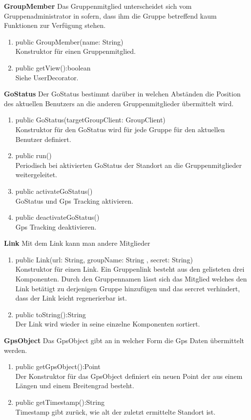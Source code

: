 \textbf{GroupMember}
Das Gruppenmitglied unterscheidet sich vom Gruppenadministrator in sofern, dass ihm die Gruppe betreffend kaum Funktionen zur Verfügung stehen.  
\begin{enumerate}
	\item public GroupMember(name: String)\\
		Konstruktor für einen Gruppenmitglied.
	\item public getView():boolean\\
		Siehe UserDecorator.
\end{enumerate}

\textbf{GoStatus}
Der GoStatus bestimmt darüber in welchen Abständen die Position des aktuellen Benutzers an die anderen Gruppenmitglieder übermittelt wird.
\begin{enumerate}
	\item public GoStatus(targetGroupClient: GroupClient)\\
		Konstruktor für den GoStatus wird für jede Gruppe für den aktuellen Benutzer definiert.
	\item public run()\\
		Periodisch bei aktivierten GoStatus der Standort an die Gruppenmitglieder weitergeleitet.
	\item public activateGoStatus()\\
		GoStatus und Gps Tracking aktivieren.
	\item public deactivateGoStatus()\\
		Gps Tracking deaktivieren.
\end{enumerate}

\textbf{Link}
Mit dem Link kann man andere Mitglieder 
\begin{enumerate}
	\item public Link(url: String, groupName: String , secret: String)\\
		Konstruktor für einen Link. Ein Gruppenlink besteht aus den gelisteten drei Komponenten. Durch den Gruppennamen lässt sich das Mitglied welches den Link betätigt zu derjenigen Gruppe hinzufügen und das sercret verhindert, dass der Link leicht regenerierbar ist.
	\item public toString():String\\
		Der Link wird wieder in seine einzelne Komponenten sortiert.
\end{enumerate}

\textbf{GpsObject}
Das GpsObject gibt an in welcher Form die Gps Daten übermittelt werden.
\begin{enumerate}
	\item public getGpsObject():Point\\
		Der Konstruktor für das GpsObject definiert ein neuen Point der aus einem Längen und einem Breitengrad besteht. 
	\item public getTimestamp():String \\
		Timestamp gibt zurück, wie alt der zuletzt ermittelte Standort ist.
\end{enumerate}

